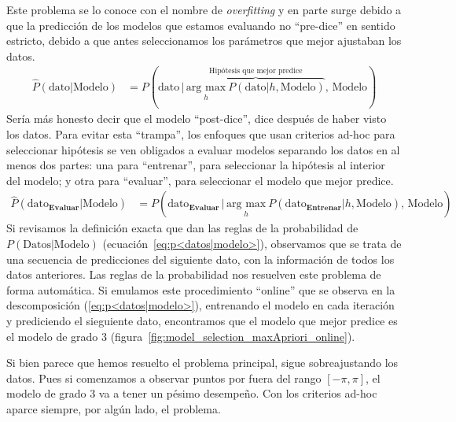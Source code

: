 \documentclass[a4paper,11pt]{book}
\theoremstyle{definition}
\begin{document}

Este problema se lo conoce con el nombre de \emph{overfitting} y en parte surge debido a que la predicción de los modelos que estamos evaluando no ``pre-dice'' en sentido estricto, debido a que antes seleccionamos los parámetros que mejor ajustaban los datos.
%
\begin{align*}
\widehat{P}(\text{dato}|\text{Modelo}) & = P(\text{dato} \, | \, \overbrace{\underset{h}{\text{arg max}} \ P(\text{dato}|h, \text{Modelo})}^{\text{Hipótesis que mejor predice}},  \, \text{Modelo} )
\end{align*}
%
Sería más honesto decir que el modelo ``post-dice'', dice después de haber visto los datos.
%
Para evitar esta ``trampa'', los enfoques que usan criterios ad-hoc para seleccionar hipótesis se ven obligados a evaluar modelos separando los datos en al menos dos partes: una para ``entrenar'', para seleccionar la hipótesis al interior del modelo; y otra para ``evaluar'', para seleccionar el modelo que mejor predice.
%
\begin{align*}
\widehat{P}(\text{dato}_{\textbf{Evaluar}}|\text{Modelo}) & = P(\text{dato}_{\textbf{Evaluar}} \, | \, \underset{h}{\text{arg max}} \ P(\text{dato}_{\textbf{Entrenar}}|h, \text{Modelo}),  \, \text{Modelo} )
\end{align*}
%
Si revisamos la definición exacta que dan las reglas de la probabilidad de $P(\text{Datos}|\text{Modelo})$ (ecuación~\ref{eq:p<datos|modelo>}), observamos que se trata de una secuencia de predicciones del siguiente dato, con la información de todos los datos anteriores.
%
Las reglas de la probabilidad nos resuelven este problema de forma  automática.
%
Si emulamos este procedimiento ``online'' que se observa en la descomposición (\ref{eq:p<datos|modelo>}), entrenando el modelo en cada iteración y prediciendo el sieguiente dato, encontramos que el modelo que mejor predice es el modelo de grado 3 (figura~\ref{fig:model_selection_maxApriori_online}).


Si bien parece que hemos resuelto el problema principal, sigue sobreajustando los datos.
%
Pues si comenzamos a observar puntos por fuera del rango $[-\pi, \pi]$, el modelo de grado 3 va a tener un pésimo desempeño.
%
Con los criterios ad-hoc aparce siempre, por algún lado, el problema.
\end{document}
